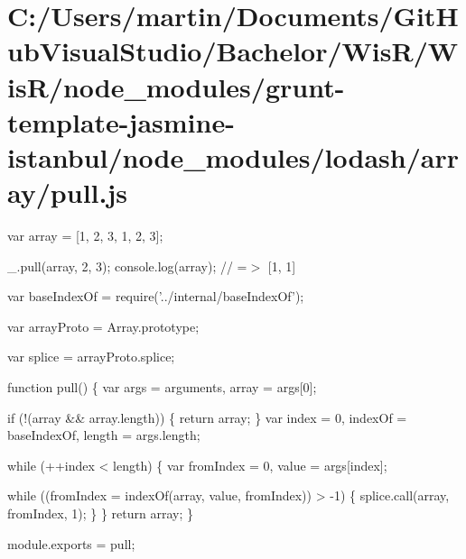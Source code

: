 \hypertarget{_c_1_2_users_2martin_2_documents_2_git_hub_visual_studio_2_bachelor_2_wis_r_2_wis_r_2node_module0b8ae4ede47f44420915879b442e9f6c}{}\section{C\+:/\+Users/martin/\+Documents/\+Git\+Hub\+Visual\+Studio/\+Bachelor/\+Wis\+R/\+Wis\+R/node\+\_\+modules/grunt-\/template-\/jasmine-\/istanbul/node\+\_\+modules/lodash/array/pull.\+js}
var array = \mbox{[}1, 2, 3, 1, 2, 3\mbox{]};

\+\_\+.\+pull(array, 2, 3); console.\+log(array); // =$>$ \mbox{[}1, 1\mbox{]}


\begin{DoxyCodeInclude}
var baseIndexOf = require(\textcolor{stringliteral}{'../internal/baseIndexOf'});

var arrayProto = Array.prototype;

var splice = arrayProto.splice;

\textcolor{keyword}{function} pull() \{
  var args = arguments,
      array = args[0];

  \textcolor{keywordflow}{if} (!(array && array.length)) \{
    \textcolor{keywordflow}{return} array;
  \}
  var index = 0,
      indexOf = baseIndexOf,
      length = args.length;

  \textcolor{keywordflow}{while} (++index < length) \{
    var fromIndex = 0,
        value = args[index];

    \textcolor{keywordflow}{while} ((fromIndex = indexOf(array, value, fromIndex)) > -1) \{
      splice.call(array, fromIndex, 1);
    \}
  \}
  \textcolor{keywordflow}{return} array;
\}

module.exports = pull;
\end{DoxyCodeInclude}
 